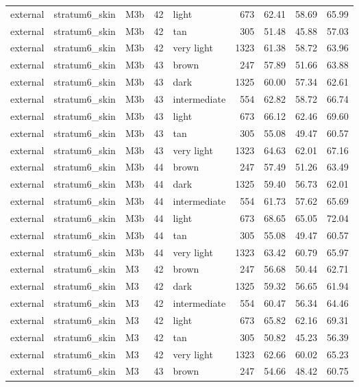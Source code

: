 \begin{tabular}{lllrlrrrr}
external & stratum6\_skin & M3b & 42 & light & 673 & 62.41 & 58.69 & 65.99 \\
external & stratum6\_skin & M3b & 42 & tan & 305 & 51.48 & 45.88 & 57.03 \\
external & stratum6\_skin & M3b & 42 & very light & 1323 & 61.38 & 58.72 & 63.96 \\
external & stratum6\_skin & M3b & 43 & brown & 247 & 57.89 & 51.66 & 63.88 \\
external & stratum6\_skin & M3b & 43 & dark & 1325 & 60.00 & 57.34 & 62.61 \\
external & stratum6\_skin & M3b & 43 & intermediate & 554 & 62.82 & 58.72 & 66.74 \\
external & stratum6\_skin & M3b & 43 & light & 673 & 66.12 & 62.46 & 69.60 \\
external & stratum6\_skin & M3b & 43 & tan & 305 & 55.08 & 49.47 & 60.57 \\
external & stratum6\_skin & M3b & 43 & very light & 1323 & 64.63 & 62.01 & 67.16 \\
external & stratum6\_skin & M3b & 44 & brown & 247 & 57.49 & 51.26 & 63.49 \\
external & stratum6\_skin & M3b & 44 & dark & 1325 & 59.40 & 56.73 & 62.01 \\
external & stratum6\_skin & M3b & 44 & intermediate & 554 & 61.73 & 57.62 & 65.69 \\
external & stratum6\_skin & M3b & 44 & light & 673 & 68.65 & 65.05 & 72.04 \\
external & stratum6\_skin & M3b & 44 & tan & 305 & 55.08 & 49.47 & 60.57 \\
external & stratum6\_skin & M3b & 44 & very light & 1323 & 63.42 & 60.79 & 65.97 \\
external & stratum6\_skin & M3 & 42 & brown & 247 & 56.68 & 50.44 & 62.71 \\
external & stratum6\_skin & M3 & 42 & dark & 1325 & 59.32 & 56.65 & 61.94 \\
external & stratum6\_skin & M3 & 42 & intermediate & 554 & 60.47 & 56.34 & 64.46 \\
external & stratum6\_skin & M3 & 42 & light & 673 & 65.82 & 62.16 & 69.31 \\
external & stratum6\_skin & M3 & 42 & tan & 305 & 50.82 & 45.23 & 56.39 \\
external & stratum6\_skin & M3 & 42 & very light & 1323 & 62.66 & 60.02 & 65.23 \\
external & stratum6\_skin & M3 & 43 & brown & 247 & 54.66 & 48.42 & 60.75 \\

\end{tabular}
